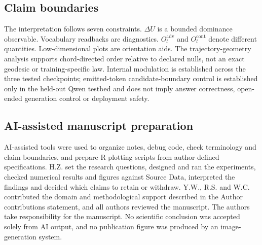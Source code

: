 \documentclass[11pt]{article}
\begin{document}
\subsection*{Claim boundaries}
The interpretation follows seven constraints. \(\Delta U\) is a bounded dominance observable. Vocabulary readbacks are diagnostics. \(O_l^{\mathrm{adv}}\) and \(O_l^{\mathrm{cont}}\) denote different quantities. Low-dimensional plots are orientation aids. The trajectory-geometry analysis supports chord-directed order relative to declared nulls, not an exact geodesic or training-specific law. Internal modulation is established across the three tested checkpoints; emitted-token candidate-boundary control is established only in the held-out Qwen testbed and does not imply answer correctness, open-ended generation control or deployment safety.

\subsection*{AI-assisted manuscript preparation}
AI-assisted tools were used to organize notes, debug code, check terminology and claim boundaries, and prepare R plotting scripts from author-defined specifications. H.Z. set the research questions, designed and ran the experiments, checked numerical results and figures against Source Data, interpreted the findings and decided which claims to retain or withdraw. Y.W., R.S. and W.C. contributed the domain and methodological support described in the Author contributions statement, and all authors reviewed the manuscript. The authors take responsibility for the manuscript. No scientific conclusion was accepted solely from AI output, and no publication figure was produced by an image-generation system.
\end{document}
